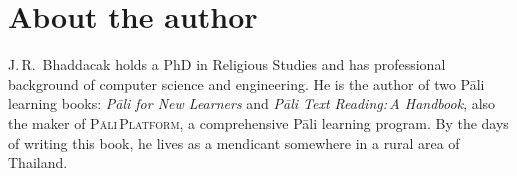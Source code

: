 \cleardoublepage
{}
{}
\chapter*{About the author}

J.\,R.\ Bhaddacak holds a PhD in Religious Studies and has professional background of computer science and engineering. He is the author of two Pāli learning books: \textit{Pāli for New Learners} and \textit{Pāli Text Reading:\,A Handbook}, also the maker of \textsc{Pāli\,Plat\-form}, a comprehensive Pāli learning program. By the days of writing this book, he lives as a mendicant somewhere in a rural area of Thailand.
